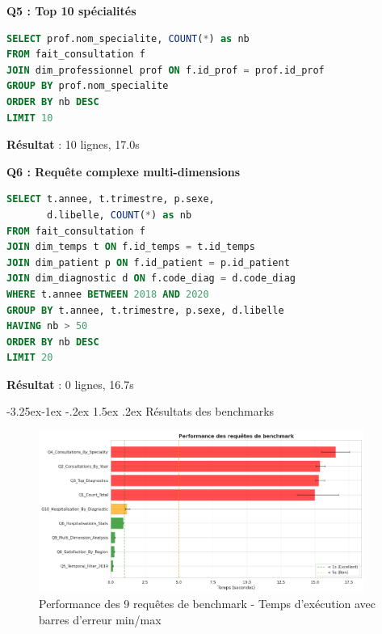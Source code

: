 \documentclass[12pt,a4paper]{article}
\makeatletter
\renewcommand\subsection{\@startsection{subsection}{2}{\z@}%
    {-3.25ex\@plus -1ex \@minus -.2ex}%
    {1.5ex \@plus .2ex}%
    {\normalfont\large\bfseries\color{blue!50!black}}}
\makeatother
\begin{document}
\textbf{Q5 : Top 10 spécialités}
\begin{lstlisting}[language=SQL, basicstyle=\small\ttfamily]
SELECT prof.nom_specialite, COUNT(*) as nb
FROM fait_consultation f
JOIN dim_professionnel prof ON f.id_prof = prof.id_prof
GROUP BY prof.nom_specialite
ORDER BY nb DESC
LIMIT 10
\end{lstlisting}
\textbf{Résultat} : 10 lignes, 17.0s

\textbf{Q6 : Requête complexe multi-dimensions}
\begin{lstlisting}[language=SQL, basicstyle=\small\ttfamily]
SELECT t.annee, t.trimestre, p.sexe,
       d.libelle, COUNT(*) as nb
FROM fait_consultation f
JOIN dim_temps t ON f.id_temps = t.id_temps
JOIN dim_patient p ON f.id_patient = p.id_patient
JOIN dim_diagnostic d ON f.code_diag = d.code_diag
WHERE t.annee BETWEEN 2018 AND 2020
GROUP BY t.annee, t.trimestre, p.sexe, d.libelle
HAVING nb > 50
ORDER BY nb DESC
LIMIT 20
\end{lstlisting}
\textbf{Résultat} : 0 lignes, 16.7s

\subsection{Résultats des benchmarks}

\begin{figure}[H]
\centering
\includegraphics[width=0.95\textwidth]{benchmark_performance_clean.png}
\caption{Performance des 9 requêtes de benchmark - Temps d'exécution avec barres d'erreur min/max}
\label{fig:perf_benchmarks}
\end{figure}
\end{document}
